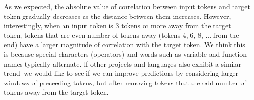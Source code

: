 \noindent
As we expected, the absolute value of correlation between input tokens and
target token gradually decreases as the distance between them increases.
However, interestingly, when an input token is 3 tokens or more away from the
target token, tokens that are even number of tokens away (tokens 4, 6, 8, ...
from the end) have a larger magnitude of correlation with the target token.
We think this is because special characters (operators) and words such as variable and
function names typically alternate. If other projects and languages
also exhibit a similar trend, we would like to see if we can improve
predictions by considering larger windows of preceeding tokens, but after
removing tokens that are odd number of tokens away from the target token.
